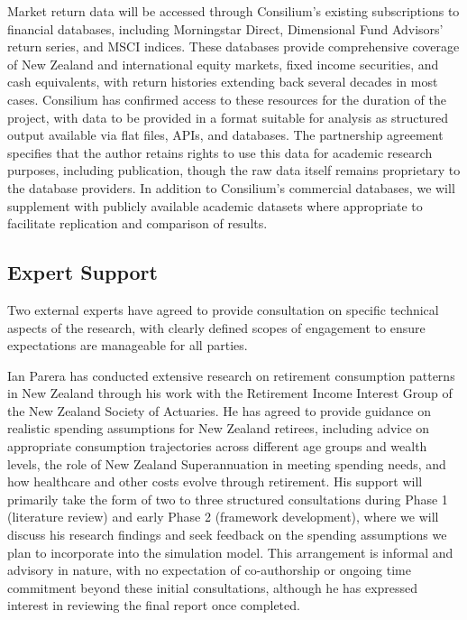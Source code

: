 \documentclass[11pt]{article}
\begin{document}
Market return data will be accessed through Consilium's existing subscriptions to financial databases, including Morningstar Direct, Dimensional Fund Advisors' return series, and MSCI indices. These databases provide comprehensive coverage of New Zealand and international equity markets, fixed income securities, and cash equivalents, with return histories extending back several decades in most cases. Consilium has confirmed access to these resources for the duration of the project, with data to be provided in a format suitable for analysis as structured output available via flat files, APIs, and databases. The partnership agreement specifies that the author retains rights to use this data for academic research purposes, including publication, though the raw data itself remains proprietary to the database providers. In addition to Consilium's commercial databases, we will supplement with publicly available academic datasets where appropriate to facilitate replication and comparison of results.

\subsection{Expert Support}

Two external experts have agreed to provide consultation on specific technical aspects of the research, with clearly defined scopes of engagement to ensure expectations are manageable for all parties.

Ian Parera has conducted extensive research on retirement consumption patterns in New Zealand through his work with the Retirement Income Interest Group of the New Zealand Society of Actuaries. He has agreed to provide guidance on realistic spending assumptions for New Zealand retirees, including advice on appropriate consumption trajectories across different age groups and wealth levels, the role of New Zealand Superannuation in meeting spending needs, and how healthcare and other costs evolve through retirement. His support will primarily take the form of two to three structured consultations during Phase 1 (literature review) and early Phase 2 (framework development), where we will discuss his research findings and seek feedback on the spending assumptions we plan to incorporate into the simulation model. This arrangement is informal and advisory in nature, with no expectation of co-authorship or ongoing time commitment beyond these initial consultations, although he has expressed interest in reviewing the final report once completed.
\end{document}
